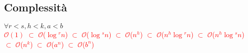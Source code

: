 \documentclass[../cheatSheetAlgoritmi.tex]{subfiles}
\begin{document}
\subsection{Complessità}
$\forall r < s, h < k, a < b$\\
\textcolor{red}{$\mathcal{O}(1)$ $\subset$ $\mathcal{O}$($\log$$^{r}n$) $\subset$ $\mathcal{O}$($\log$$^{s}n$) $\subset$ $\mathcal{O}$($n^{h}$) $\subset$ $\mathcal{O}$($n^{h}$$\log$$^{r}n$)  $\subset$ $\mathcal{O}$($n^{h}$$\log$$^{s}n$) $\subset$ $\mathcal{O}$($n^{k}$) $\subset$ $\mathcal{O}$($a^{n}$) $\subset$ $\mathcal{O}$($b^{n}$)}
\end{document}
